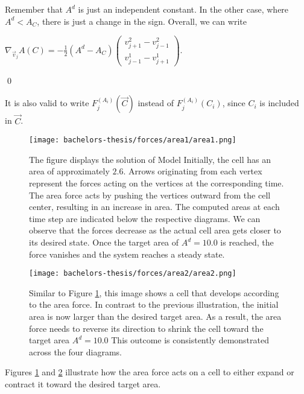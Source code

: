 \begin{proposition}
	Remember that $A^d$ is just an independent constant. 
	In the other case, where $A^d < A_{C}$, there is just a change in the sign. 
	Overall, we can write 
\begin{center}
	$
	\nabla_{\vec{v}_j} A(C) = - \frac{1}{2} (A^d - A_{C}) \begin{pmatrix}
		v_{j+1}^2 - v_{j-1}^2  \\[0.5em]
	   v_{j-1}^1  - v_{j+1}^1 
  	\end{pmatrix}.
	$
\end{center}

	\qed
\end{proposition}
It is also valid to write $F_{j}^{(A_i)}(\vec{C})$ instead of $F_{j}^{(A_i)}(C_i)$, since $C_i$ is included in $\vec{C}$. 


\begin{figure}[h!]
	\begin{center}
		\texttt{[image: bachelors-thesis/forces/area1/area1.png]}
		\caption{The figure displays the solution of Model  
		Initially, the cell has an area of approximately $2.6$. 
		Arrows originating from each vertex represent the forces acting on the vertices at the corresponding time.
		The area force acts by pushing the vertices outward from the cell center, resulting in an increase in area.
		The computed areas at each time step are indicated below the respective diagrams.
		We can observe that the forces decrease as the actual cell area gets closer to its desired state. 
		Once the target area of $A^d = 10.0$ is reached, the force vanishes and the system reaches a steady state.
		}
		\label{fig:areaForce}
	\end{center}
\end{figure}

\begin{figure}[h!]
	\begin{center}
		\texttt{[image: bachelors-thesis/forces/area2/area2.png]}
		\caption{Similar to Figure \ref{fig:areaForce}, this image shows a cell that develops according to the area force. 
		In contrast to the previous illustration, the initial area is now larger than the desired target area.
		As a result, the area force needs to reverse its direction to shrink the cell toward the target area $A^d = 10.0$
		This outcome is consistently demonstrated across the four diagrams. }
		\label{fig:areaForce2}
	\end{center}
\end{figure}

Figures \ref{fig:areaForce} and \ref{fig:areaForce2} illustrate how the area force acts on a cell to either expand or contract it toward the desired target area.

